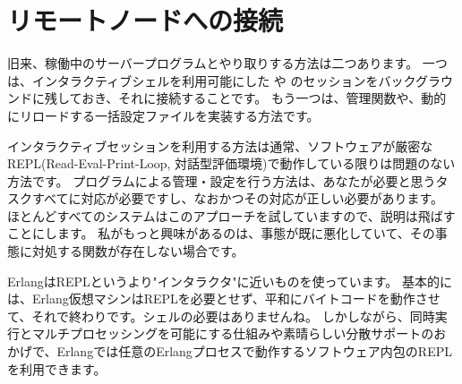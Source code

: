\chapter{リモートノードへの接続}
\label{chap:connecting}

旧来、稼働中のサーバープログラムとやり取りする方法は二つあります。
一つは、インタラクティブシェルを利用可能にした や  のセッションをバックグラウンドに残しておき、それに接続することです。
もう一つは、管理関数や、動的にリロードする一括設定ファイルを実装する方法です。

インタラクティブセッションを利用する方法は通常、ソフトウェアが厳密なREPL(Read-Eval-Print-Loop, 対話型評価環境)で動作している限りは問題のない方法です。
プログラムによる管理・設定を行う方法は、あなたが必要と思うタスクすべてに対応が必要ですし、なおかつその対応が正しい必要があります。 %
ほとんどすべてのシステムはこのアプローチを試していますので、説明は飛ばすことにします。 %
私がもっと興味があるのは、事態が既に悪化していて、その事態に対処する関数が存在しない場合です。

ErlangはREPLというより"インタラクタ"に近いものを使っています。
基本的には、Erlang仮想マシンはREPLを必要とせず、平和にバイトコードを動作させて、それで終わりです。シェルの必要はありませんね。 %
しかしながら、同時実行とマルチプロセッシングを可能にする仕組みや素晴らしい分散サポートのおかげで、Erlangでは任意のErlangプロセスで動作するソフトウェア内包のREPLを利用できます。

